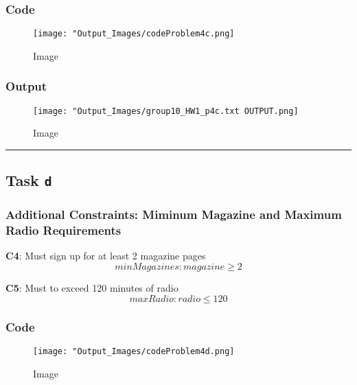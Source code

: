 \documentclass[
  12pt,
]{article}
\begin{document}
\hypertarget{code-3}{%
\subsubsection{Code}\label{code-3}}

\begin{figure}
\centering
\texttt{[image: "Output\_Images/codeProblem4c.png]}
\caption{Image}
\end{figure}

\hypertarget{output-3}{%
\subsubsection{Output}\label{output-3}}

\begin{figure}
\centering
\texttt{[image: "Output\_Images/group10\_HW1\_p4c.txt OUTPUT.png]}
\caption{Image}
\end{figure}

\begin{center}\rule{0.5\linewidth}{0.5pt}\end{center}

\hypertarget{task-d}{%
\subsection{\texorpdfstring{Task \texttt{d}}{Task d}}\label{task-d}}

\hypertarget{additional-constraints-miminum-magazine-and-maximum-radio-requirements}{%
\subsubsection{Additional Constraints: Miminum Magazine and Maximum
Radio
Requirements}\label{additional-constraints-miminum-magazine-and-maximum-radio-requirements}}

\textbf{C4}: Must sign up for at least 2 magazine pages \[
minMagazines: magazine \geq 2
\]

\textbf{C5}: Must to exceed 120 minutes of radio \[
maxRadio: radio \leq 120
\]

\hypertarget{code-4}{%
\subsubsection{Code}\label{code-4}}

\begin{figure}
\centering
\texttt{[image: "Output\_Images/codeProblem4d.png]}
\caption{Image}
\end{figure}
\end{document}
